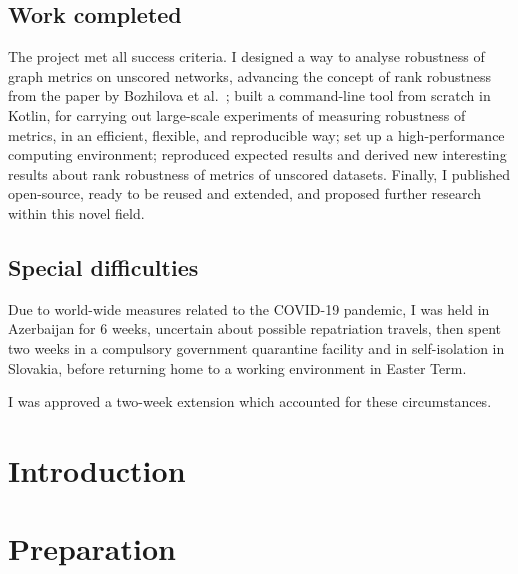 \documentclass[12pt,a4paper,twoside,openany]{report}
\begin{document}
    \section*{Work completed}

    The project met all success criteria.
    I designed a way to analyse robustness of graph metrics on unscored networks, advancing the concept of rank robustness from the paper by Bozhilova et al.~\cite{Bozhilova2019}; built a command-line tool \graffs from scratch in Kotlin, for carrying out large-scale experiments of measuring robustness of metrics, in an efficient, flexible, and reproducible way; set up a high-performance computing environment; reproduced expected results and derived new interesting results about rank robustness of metrics of unscored datasets.
    Finally, I published \graffs open-source, ready to be reused and extended, and proposed further research within this novel field.


    \section*{Special difficulties}

    Due to world-wide measures related to the COVID-19 pandemic, I was held in Azerbaijan for 6 weeks, uncertain about possible repatriation travels, then spent two weeks in a compulsory government quarantine facility and in self-isolation in Slovakia, before returning home to a working environment in Easter Term.

    I was approved a two-week extension which accounted for these circumstances.


    \tableofcontents
    \clearpage



    \pagestyle{headings}

    \chapter{Introduction}\label{ch:introduction}
    


    \chapter{Preparation}\label{ch:preparation}
    
\end{document}
